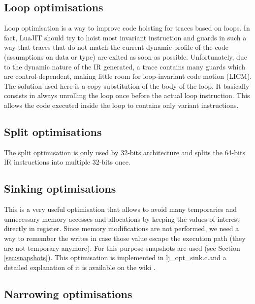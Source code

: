 \subsection{Loop optimisations}
\label{Subsec:opt-loop}

Loop optimisation is a way to improve code hoisting for traces based on
loops. In fact, LuaJIT should try to hoist most invariant instruction and guards
in such a way that traces that do not match the current dynamic profile of
the code (assumptions on data or type) are exited as soon as possible.
Unfortunately, due to the dynamic nature of the IR generated, a trace contains many
guards which are control-dependent, making little room for loop-invariant
code motion (LICM). The solution used here is a copy-substitution of the body
of the loop. It basically consists in always unrolling the loop once before the
actual loop instruction. This allows the code executed inside the loop to
contains only variant instructions.

\subsection{Split optimisations}
\label{Subsec:opt-split}

The split optimisation is only used by 32-bits architecture and splits the
64-bits IR instructions into multiple 32-bits once.

\subsection{Sinking optimisations}
\label{Subsec:opt-sinking}
This is a very useful optimisation that allows to avoid many temporaries and
unnecessary memory accesses and allocations by keeping the values of interest
directly in register. Since memory modifications are not performed, we need a way
to remember the writes in case those value escape the execution path
(they are not temporary anymore). For this purpose snapshots are used (see Section \ref{sec:snapshots}).
This optimisation is implemented in \texttt{}{lj\_opt\_sink.c}.and a detailed
explanation of it is available on the wiki \cite{luajit-sink}.

\subsection{Narrowing optimisations}
\label{Subsec:narrowing}


